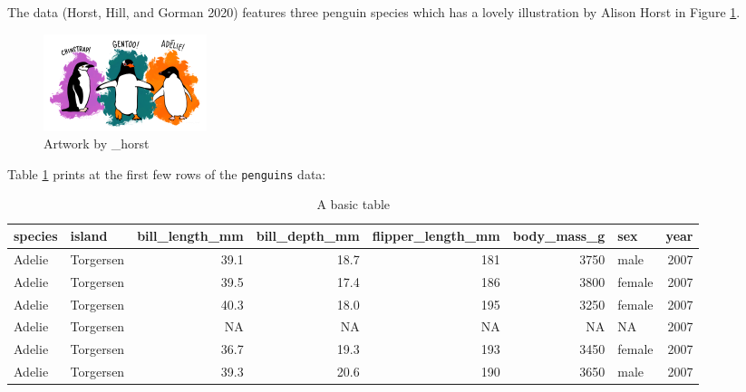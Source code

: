 The  data (Horst, Hill, and Gorman 2020) features three penguin species which has a lovely illustration by Alison Horst in Figure \ref{fig:penguins-alison}.

\begin{figure}
\includegraphics[width=1\linewidth,height=0.3\textheight]{penguins} \caption{Artwork by \@allison\_horst}\label{fig:penguins-alison}
\end{figure}

Table \ref{tab:penguins-tab-static} prints at the first few rows of the \texttt{penguins} data:

\begin{table}

\caption{\label{tab:penguins-tab-static}A basic table}
\centering
\fontsize{7}{9}\selectfont
\begin{tabular}[t]{l|l|r|r|r|r|l|r}
\hline
species & island & bill\_length\_mm & bill\_depth\_mm & flipper\_length\_mm & body\_mass\_g & sex & year\\
\hline
Adelie & Torgersen & 39.1 & 18.7 & 181 & 3750 & male & 2007\\
\hline
Adelie & Torgersen & 39.5 & 17.4 & 186 & 3800 & female & 2007\\
\hline
Adelie & Torgersen & 40.3 & 18.0 & 195 & 3250 & female & 2007\\
\hline
Adelie & Torgersen & NA & NA & NA & NA & NA & 2007\\
\hline
Adelie & Torgersen & 36.7 & 19.3 & 193 & 3450 & female & 2007\\
\hline
Adelie & Torgersen & 39.3 & 20.6 & 190 & 3650 & male & 2007\\
\hline
\end{tabular}
\end{table}

